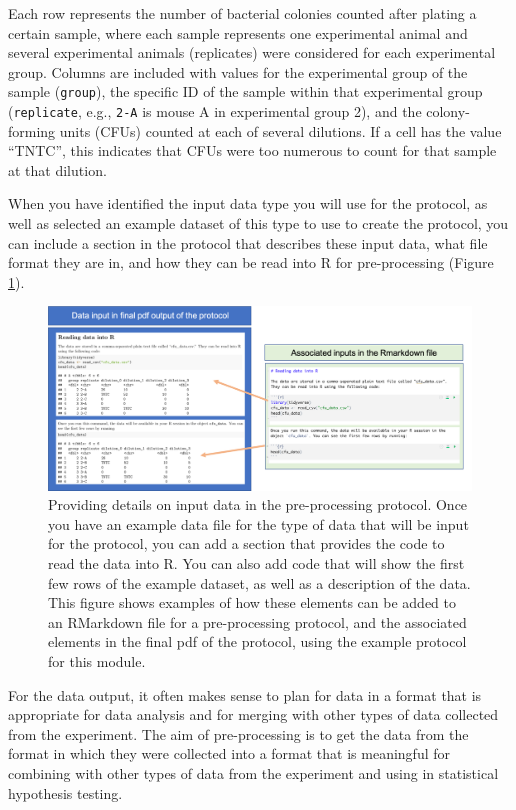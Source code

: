 \documentclass[]{tufte-book}
\begin{document}
Each row represents the number of bacterial colonies counted after plating a
certain sample, where each sample represents one experimental animal and several
experimental animals (replicates) were considered for each experimental group.
Columns are included with values for the experimental group of the sample
(\texttt{group}), the specific ID of the sample within that experimental group
(\texttt{replicate}, e.g., \texttt{2-A} is mouse A in experimental group 2), and the
colony-forming units (CFUs) counted at each of several dilutions. If a cell has
the value ``TNTC'', this indicates that CFUs were too numerous to count for that
sample at that dilution.

When you have identified the input data type you will use for the protocol,
as well as selected an example dataset of this type to use to create the
protocol, you can include a section in the protocol
that describes these input data, what file format they are in, and how they
can be read into R for pre-processing (Figure \ref{fig:protocoldatainput}).

\begin{figure}
\includegraphics[width=\textwidth]{figures/protocol_data_input} \caption[Providing details on input data in the pre-processing protocol]{Providing details on input data in the pre-processing protocol. Once you have an example data file for the type of data that will be input for the protocol, you can add a section that provides the code to read the data into R. You can also add code that will show the first few rows of the example dataset, as well as a description of the data. This figure shows examples of how these elements can be added to an RMarkdown file for a pre-processing protocol, and the associated elements in the final pdf of the protocol, using the example protocol for this module.}\label{fig:protocoldatainput}
\end{figure}

For the data output, it often makes sense to plan for data in a format that is
appropriate for data analysis and for merging with other types of data collected
from the experiment. The aim of pre-processing is to get the data from the
format in which they were collected into a format that is meaningful for
combining with other types of data from the experiment and using in statistical
hypothesis testing.
\end{document}
